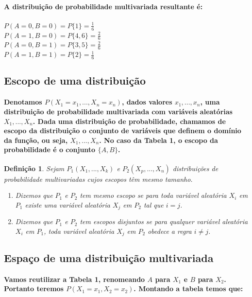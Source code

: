 \documentclass[a4paper,10pt]{article}
\theoremstyle{plain}
\newtheorem*{spn-def}{Definição}
\begin{document}
\paragraph{
  A distribuição de probabilidade multivariada resultante é:
}

\subparagraph{$P(A=0,B=0) = P\{1\} = \frac{1}{6}$ \\
  $P(A=1,B=0) = P\{4,6\} = \frac{2}{6}$ \\
  $P(A=0,B=1) = P\{3,5\} = \frac{2}{6}$ \\
  $P(A=1,B=1) = P\{2\} = \frac{1}{6}$
} 

\subsection{Escopo de uma distribuição}

\paragraph{
  Denotamos $P(X_1=x_1,...,X_n=x_n)$, dados valores $x_1,...,x_n$, uma distribuição de probabilidade multivariada
com variáveis aleatórias $X_1,...,X_n$. Dada uma distribuição de probabilidade, chamamos de escopo da distribuição 
o conjunto de variáveis que definem o domínio da função, ou seja, $X_1,...,X_n$. No caso da Tabela 1, o escopo da 
probabilidade é o conjunto $\{A, B\}$. 
}

\begin{spn-def} Sejam $P_1 (X_1,...,X_k)$ e $P_2 (X_p,...,X_n)$ distribuições de probabilidade multivariadas cujos
  escopos têm mesmo tamanho.
\begin{enumerate} \itemsep0pt
  \item Dizemos que $P_1$ e $P_2$ tem mesmo escopo se para toda variável aleatória $X_i$ em $P_1$ existe uma
variável aleatória $X_j$ em $P_2$ tal que $i=j$.
  \item Dizemos que $P_1$ e $P_2$ tem escopos disjuntos se para qualquer variável aleatória $X_i$ em $P_1$,
toda variável aleatória $X_j$ em $P_2$ obedece a regra $i\neq{j}$. 
\end{enumerate}
\end{spn-def}

\subsection{Espaço de uma distribuição multivariada}

\paragraph{
  Vamos reutilizar a Tabela 1, renomeando $A$ para $X_1$ e $B$ para $X_2$. Portanto teremos $P(X_1=x_1,X_2=x_2)$. 
Montando a tabela temos que:
}
\end{document}
